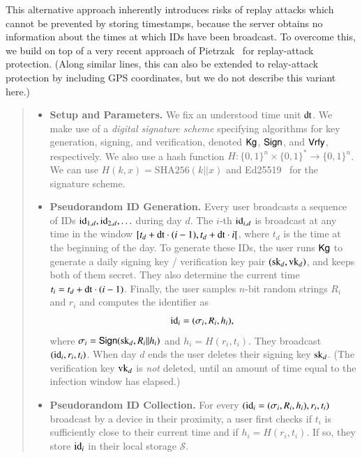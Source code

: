 This alternative approach inherently introduces risks of replay attacks which cannot be prevented by storing timestamps, because the server obtains no information about the times at which IDs have been broadcast. To overcome this, we build on top of a very recent approach of Pietrzak~\cite{EPRINT:Pietrzak20} for replay-attack protection. (Along similar lines, this can also be extended to relay-attack protection by including GPS coordinates, but we do not describe this variant here.)

\begin{quote}
\begin{itemize}
    \item {\bf Setup and Parameters.} We fix an understood time unit $\mathrm{dt}$. We make use of a \emph{digital signature scheme} specifying algorithms for key generation, signing, and verification, denoted $\mathsf{Kg}$, $\mathsf{Sign}$, and $\mathsf{Vrfy}$, respectively. We also use a hash function $H:\{0,1\}^n\times\{0,1\}^\ast\to\{0,1\}^n$. We can use $H(k,x)=\textrm{SHA256}(k||x)$ and Ed25519~\cite{bernstein,Ed25519} for the signature scheme.
    \item {\bf Pseudorandom ID Generation.} Every user broadcasts a sequence of IDs $\mathrm{id}_{1,d}, \mathrm{id}_{2,d}, \ldots$ during day $d$.  The $i$-th $\mathrm{id}_{i,d}$ is broadcast at any time in the window $[t_d+ \mathrm{dt}\cdot (i-1), t_d + \mathrm{dt}\cdot i[$, where $t_d$ is the time at the beginning of the day. To generate these IDs, the user runs $\mathsf{Kg}$ to generate a daily signing key / verification key pair $(\mathrm{sk}_{d}, \mathrm{vk}_{d})$, and keeps both of them secret. They also determine the current time $t_i=t_d+ \mathrm{dt}\cdot (i-1)$. %
    Finally, the user samples $n$-bit random strings $R_i$ and $r_i$ and computes the identifier as 
		\begin{displaymath}
		\mathrm{id}_i = (\sigma_i, R_i, h_i), \;
		\end{displaymath}
		where $\sigma_i = \mathsf{Sign}(\mathrm{sk}_{d}, R_i|| h_i)$ and $h_i=H(r_i, t_i)$.
		They broadcast $(\mathrm{id}_i, r_i, t_i)$.
		When day $d$ ends the user deletes their signing key $\mathrm{sk}_d$. (The verification key $\mathrm{vk}_d$ is {\em not} deleted, until an amount of time equal to the infection window has elapsed.)
	\item {\bf Pseudorandom ID Collection.} For every $(\mathrm{id}_i = (\sigma_i, R_i, h_i),r_i, t_i)$ broadcast by a device in their proximity, a user first checks if $t_i$ is sufficiently close to their current time and if $h_i = H(r_i, t_i)$. If so, they store $\mathrm{id}_i$ in their local storage $\mathcal{S}$.

\end{itemize}
\end{quote}
